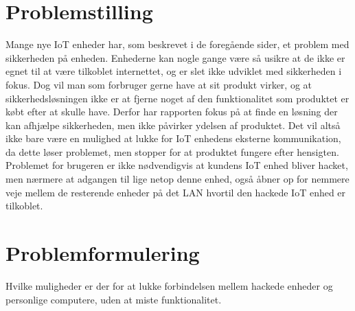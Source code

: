 \section{Problemstilling}


Mange nye IoT enheder har, som beskrevet i de foregående sider, et problem med sikkerheden på enheden. Enhederne kan nogle gange være så usikre at de ikke er egnet til at være tilkoblet internettet, og er slet ikke udviklet med sikkerheden i fokus. Dog vil man som forbruger gerne have at sit produkt virker, og at sikkerhedsløsningen ikke er at fjerne noget af den funktionalitet som produktet er købt efter at skulle have. Derfor har rapporten fokus på at finde en løsning der kan afhjælpe sikkerheden, men ikke påvirker ydelsen af produktet. Det vil altså ikke bare være en mulighed at lukke for IoT enhedens eksterne kommunikation, da dette løser problemet, men stopper for at produktet fungere efter hensigten.\\
Problemet for brugeren er ikke nødvendigvis at kundens IoT enhed bliver hacket, men nærmere at adgangen til lige netop denne enhed, også åbner op for nemmere veje mellem de resterende enheder på det LAN hvortil den hackede IoT enhed er tilkoblet.



\section{Problemformulering}
Hvilke muligheder er der for at lukke forbindelsen mellem hackede enheder og personlige computere, uden at miste funktionalitet.
\\
\\
